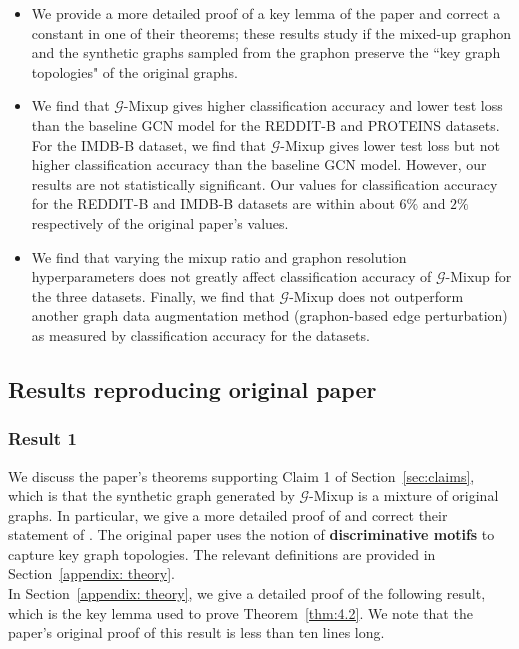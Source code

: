 \begin{itemize}
    \item We provide a more detailed proof of a key lemma of the paper and correct a constant in one of their theorems; these results study if the mixed-up graphon and the synthetic graphs sampled from the graphon preserve the ``key graph topologies" of the original graphs. 
    \item We find that $\mathcal{G}$-Mixup gives higher classification accuracy and lower test loss than the baseline GCN model for the REDDIT-B and PROTEINS datasets. For the IMDB-B dataset, we find that $\mathcal{G}$-Mixup gives lower test loss but not higher classification accuracy than the baseline GCN model. However, our results are not statistically significant. Our values for classification accuracy for the REDDIT-B and IMDB-B datasets are within about $6\%$ and $2\%$ respectively of the original paper's values.
    \item We find that varying the mixup ratio and graphon resolution hyperparameters does not greatly affect classification accuracy of $\mathcal{G}$-Mixup for the three datasets. Finally, we find that $\mathcal{G}$-Mixup does not outperform another graph data augmentation method (graphon-based edge perturbation) as measured by classification accuracy for the datasets.
\end{itemize}


\subsection{Results reproducing original paper}



\subsubsection{Result 1}\label{result 1}
We discuss the paper's theorems supporting Claim 1 of Section~\ref{sec:claims}, which is that the synthetic graph generated by $\mathcal{G}$-Mixup is a mixture of original graphs. In particular, we give a more detailed proof of \cite[Lemma A.2]{Han:2022} and correct their statement of \cite[Theorem 4.3]{Han:2022}. The original paper uses the notion of \textbf{discriminative motifs} to capture key graph topologies. The relevant definitions are provided in Section~\ref{appendix: theory}.
\\

In Section~\ref{appendix: theory}, we give a detailed proof of the following result, which is the key lemma used to prove Theorem~\ref{thm:4.2}. We note that the paper's original proof of this result is less than ten lines long.


